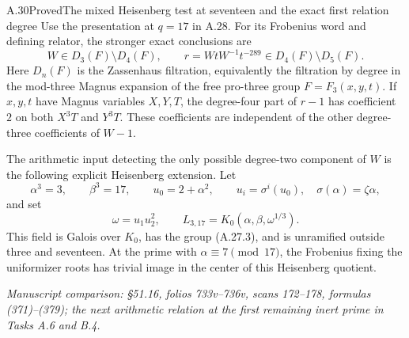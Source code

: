 \begin{statement}{A.30}{Proved}{The mixed Heisenberg test at seventeen and the exact first relation degree}
Use the presentation at $q=17$ in A.28.
For its Frobenius word and defining relator,
the stronger exact conclusions are
\[
 W\in D_3(F)\setminus D_4(F),\qquad
 r=WtW^{-1}t^{-289}
           \in D_4(F)\setminus D_5(F).
 \tag{A.30.1}
\]
Here $D_n(F)$ is the Zassenhaus filtration,
equivalently the filtration by degree in
the mod-three Magnus expansion of the
free pro-three group $F=F_3(x,y,t)$.
If $x,y,t$ have Magnus variables $X,Y,T$,
the degree-four part of $r-1$ has
coefficient $2$ on both $X^3T$ and
$Y^3T$. These coefficients are
independent of the other degree-three
coefficients of $W-1$.

The arithmetic input detecting the
only possible degree-two component
of $W$ is the following explicit
Heisenberg extension. Let
\[
 \alpha^3=3,\qquad \beta^3=17,
 \qquad u_0=2+\alpha^2,
 \qquad u_i=\sigma^i(u_0),
 \quad \sigma(\alpha)=\zeta\alpha,
\]
and set
\[
 \omega=u_1u_2^2,
 \qquad L_{3,17}=K_0(\alpha,\beta,\omega^{1/3}).
 \tag{A.30.2}
\]
This field is Galois over $K_0$, has
the group (A.27.3), and is unramified
outside three and seventeen. At the
prime with $\alpha\equiv7\pmod{17}$,
the Frobenius fixing the uniformizer
roots has trivial image in the center
of this Heisenberg quotient.
\par\smallskip\noindent\emph{Manuscript comparison: \S51.16,
folios 733v--736v, scans 172--178, formulas (371)--(379);
the next arithmetic relation at the first remaining inert prime
in Tasks A.6 and B.4.}
\end{statement}
